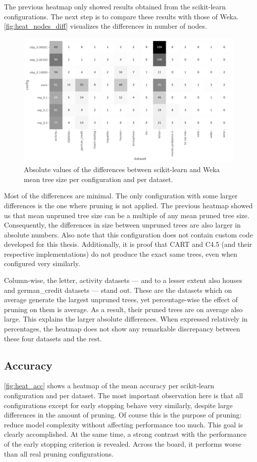The previous heatmap only showed results obtained from the scikit-learn configurations. The next step is to compare these results with those of Weka. \autoref{fig:heat_nodes_diff} visualizes the differences in number of nodes.

\begin{figure}[htp]
    \includegraphics[width=\textwidth]{img/heatmap_n_nodes_diff.pdf}
    \caption{Absolute values of the differences between scikit-learn and Weka mean tree size per configuration and per dataset.}%
    \label{fig:heat_nodes_diff}
\end{figure}

Most of the differences are minimal. The only configuration with some larger differences is the one where pruning is not applied. The previous heatmap showed us that mean unpruned tree size can be a multiple of any mean pruned tree size. Consequently, the differences in size between unpruned trees are also larger in absolute numbers. Also note that this configuration does not contain custom code developed for this thesis. Additionally, it is proof that CART and C4.5 (and their respective implementations) do not produce the exact same trees, even when configured very similarly.

Column-wise, the letter, activity datasets --- and to a lesser extent also houses and german\_credit datasets --- stand out. These are the datasets which on average generate the largest unpruned trees, yet percentage-wise the effect of pruning on them is average. As a result, their pruned trees are on average also large. This explains the larger absolute differences. When expressed relatively in percentages, the heatmap does not show any remarkable discrepancy between these four datasets and the rest.

\subsection{Accuracy}
\autoref{fig:heat_acc} shows a heatmap of the mean accuracy per scikit-learn configuration and per dataset. The most important observation here is that all configurations except for early stopping behave very similarly, despite large differences in the amount of pruning. Of course this is the purpose of pruning: reduce model complexity without affecting performance too much. This goal is clearly accomplished. At the same time, a strong contrast with the performance of the early stopping criterion is revealed. Across the board, it performs worse than all real pruning configurations.

